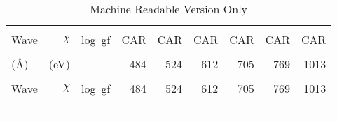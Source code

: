 \clearpage
\begin{longtable}{lrr|rrrrrr}
\caption[]{Machine Readable Version Only} \\
 \hline \hline \\[-1.0ex]
 Wave &  $\chi$ & log~gf & CAR & CAR & CAR & CAR & CAR & CAR \\[0.5ex] \hline
 \\[-1.0ex]
 (\AA) &  (eV) &  & 484 & 524 & 612 & 705 & 769 & 1013  \\[0.5ex] \hline
\endfirsthead
 \hline \\[-1.0ex]
 Wave &  $\chi$ & log~gf & 484 & 524 & 612 & 705 & 769 & 1013  \\[0.5ex] \hline
 \\[0.5ex]
\endhead
 \\ [-1.0ex] \hline 
\endfoot
 \\[-1.0ex] \hline \hline
\endlastfoot


\end{longtable}
